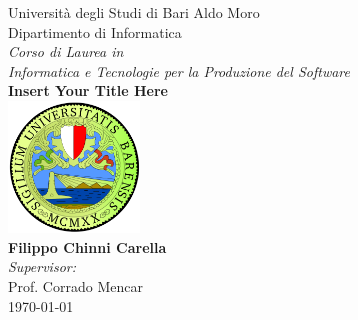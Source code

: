 \documentclass[12pt,twoside]{book}
\numberwithin{figure}{section}
\numberwithin{table}{section}
\numberwithin{equation}{section}
\begin{document}
\setcounter{secnumdepth}{3}
\setcounter{tocdepth}{3}


\frontmatter

\begin{titlepage}


\begin{center}
{\LARGE Università degli Studi di Bari Aldo Moro}\\[0.25cm]
{\Large Dipartimento di Informatica}\\[1cm]
{\large \emph{Corso di Laurea in\\[1cm]Informatica e Tecnologie per la Produzione del Software}}\\[2.5cm]
\linespread{1.2}\huge {\bfseries Insert Your Title Here}\\[1.5cm]
\linespread{1}
\includegraphics[width=3.5cm]{images/uniba-logo.png}\\[1.5cm]
{\Large\bf Filippo Chinni Carella}\\[1cm]
\large \emph{Supervisor:}\\
Prof. Corrado Mencar\\[1cm] 
\vspace{\fill}
\today
\end{center}

\end{titlepage}


\end{document}

